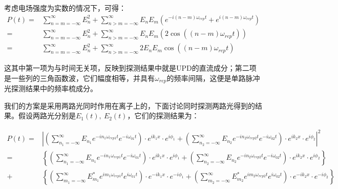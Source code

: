 考虑电场强度为实数的情况下，可得：
\begin{align}
    P(t)=&\sum_{n=m=-\infty}^{\infty}E_n^2 + \sum_{n>m=-\infty}^{\infty}E_n E_m\left(e^{-i(n-m)\omega_{rep}t}+e^{i(n-m)\omega_{rep}t}\right)\\
    =&\sum_{n=m=-\infty}^{\infty}E_n^2 + \sum_{n>m=-\infty}^{\infty}E_n E_m\left(2\cos\left((n-m)\omega_{rep}t\right)\right)\\
    =&\sum_{n=m=-\infty}^{\infty}E_n^2 + \sum_{n>m=-\infty}^{\infty}2E_n E_m \cos\left((n-m)\omega_{rep}t\right)\label{eq:pt_res2}
\end{align}

这其中第一项为与时间无关项，反映到探测结果中就是UPD的直流成分；第二项是一些列的三角函数波，它们幅度相等，并具有$\omega_{rep}$的频率间隔，这便是单路脉冲光探测结果中的频率梳成分。

我们的方案是采用两路光同时作用在离子上的，下面讨论同时探测两路光得到的结果。假设两路光分别是$E_1(t),\ E_2(t)$，它们的探测结果为：
\begin{footnotesize}
\begin{align}
    P(t)=&\left|\left(\sum_{n_1=-\infty}^{\infty}E_{n_1}e^{-in_1\omega_{rep1}t}e^{-i\omega_{01}t}\right)\cdot e^{ik_1x}\cdot e^{i\phi_1} + \left(\sum_{n_2=-\infty}^{\infty}E_{n_2}e^{-in_2\omega_{rep2}t}e^{-i\omega_{02}t}\right)\cdot e^{ik_2x}\cdot e^{i\phi_2}\right|^2\\
    =&\left\{\left(\sum_{n_1=-\infty}^{\infty}E_{n_1}e^{-in_1\omega_{rep1}t}e^{-i\omega_{01}t}\right)\cdot e^{ik_1x}\cdot e^{i\phi_1} + \left(\sum_{n_2=-\infty}^{\infty}E_{n_2}e^{-in_2\omega_{rep2}t}e^{-i\omega_{02}t}\right)\cdot e^{ik_2x}\cdot e^{i\phi_2}\right\}\\
    +&\left\{\left(\sum_{m_1=-\infty}^{\infty}E_{m_1}^* e^{im_1\omega_{rep1}t}e^{i\omega_{01}t}\right)\cdot e^{-ik_1x}\cdot e^{-i\phi_1} + \left(\sum_{m_2=-\infty}^{\infty}E_{m_2}^*e^{im_2\omega_{rep2}t}e^{i\omega_{02}t}\right)\cdot e^{-ik_2x}\cdot e^{-i\phi_2}\right\}\label{eq:pt_res3}
\end{align}
\end{footnotesize}


